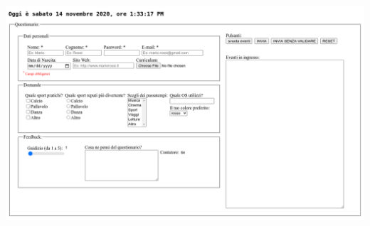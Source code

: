 \documentclass[11pt]{report}
\begin{document}
\begin{center}
\includegraphics[scale=0.4]{img/10.PNG}
\end{center}


  








 
 
\end{document}
